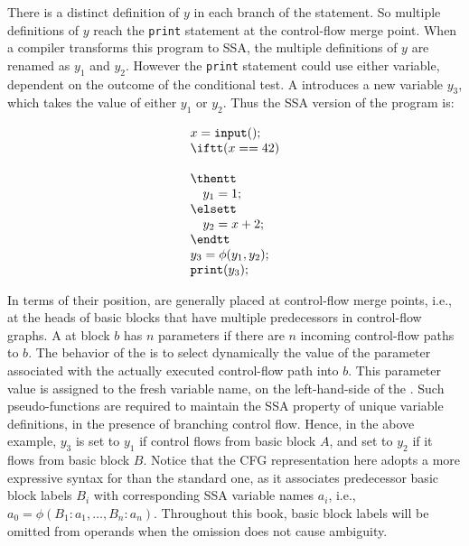 There is a distinct definition of $y$ in each branch of the \iftt
statement. So multiple definitions of $y$ reach the \texttt{print} statement
at the control-flow merge point. When a compiler transforms this program 
to SSA,
the multiple definitions of $y$ are renamed as $y_1$ and $y_2$. However 
the \texttt{print} statement could use either variable, dependent on the
outcome of the \iftt conditional test. A \phifun introduces
a new variable $y_3$, which takes the value of either $y_1$ or $y_2$.
Thus the SSA version of the program is:
\smallskip

\begin{minipage}{0.4\textwidth}
\begin{equation*}
\begin{array}{l}
x = \texttt{input}();\\
\iftt (x == 42)\\
\\
\thentt\\
\quad    y_1 = 1;\\
\elsett\\
\quad    y_2 = x + 2;\\
\endtt\\
y_3 = \phi(y_1,y_2);\\
\texttt{print}(y_3);\\
\end{array}
\end{equation*}
\end{minipage}
\begin{minipage}{0.4\textwidth}
\strut
\end{minipage}
\bigskip


In terms of their position, 
\phifuns{} are generally placed at control-flow merge points,
i.e., at the heads of basic blocks that have multiple predecessors in
control-flow graphs.
A \phifun at block $b$ has
$n$ parameters if there are $n$ incoming control-flow paths to $b$.
The behavior of the \phifun is to select dynamically
the value of the parameter associated with the actually executed
control-flow path into $b$.
This parameter value is assigned to the fresh variable name,
on the left-hand-side of the \phifun.
Such pseudo-functions are required to maintain the SSA property
of unique variable definitions,
in the presence of branching control flow.
Hence, in the above example, $y_3$ is set to $y_1$ if 
control flows from basic block $A$, and set to $y_2$ if it flows from
basic block $B$.
Notice that the CFG representation here adopts a more expressive syntax for
\phifuns than the standard one, as it associates predecessor basic block labels $B_i$
with corresponding SSA variable names $a_i$, i.e.,\
$a_0 = \phi(B_1:a_1, \ldots, B_n:a_n)$.
Throughout this book, basic block labels will be omitted from \phifun
operands when the omission does not cause ambiguity.

